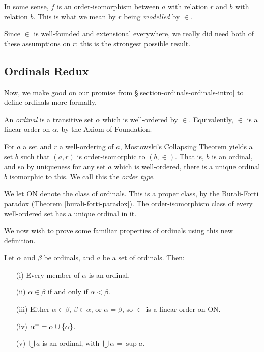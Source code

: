 \documentclass{article}
\begin{document}
\begin{note}
	In some sense, $f$ is an order-isomorphism between $a$ with relation $r$ and $b$ with relation $b$. This is what we mean by $r$ being \textit{modelled} by $\in$.
\end{note}

\begin{corollary}
    Since $\in$ is well-founded and extensional everywhere, we really did need both of these assumptions on $r$: this is the strongest possible result.
\end{corollary}


\subsection{Ordinals Redux}
\label{section-set-theory-ordinals}

Now, we make good on our promise from \S\ref{section-ordinals-ordinals-intro} to define ordinals more formally.

\begin{definition}[Ordinal]
	\label{ch5-formal-ordinal}
    An \textit{ordinal} is a transitive set $\alpha$ which is well-ordered by $\in$. Equivalently, $\in$ is a linear order on $\alpha$, by the Axiom of Foundation.
\end{definition}

\begin{note}
	For $a$ a set and $r$ a well-ordering of $a$, Mostowski's Collapsing Theorem yields a set $b$ such that $(a, r)$ is order-isomorphic to $(b, \in)$. That is, $b$ is an ordinal, and so by uniqueness for any set $a$ which is well-ordered, there is a unique ordinal $b$ isomorphic to this. We call this the \textit{order type}.
\end{note}

\begin{note}
	We let ON denote the class of ordinals. This is a proper class, by the Burali-Forti paradox (Theorem \ref{burali-forti-paradox}). The order-isomorphism class of every well-ordered set has a unique ordinal in it.
\end{note}

We now wish to prove some familiar properties of ordinals using this new definition.

\begin{proposition}
    Let $\alpha$ and $\beta$ be ordinals, and $a$ be a set of ordinals. Then:
    \begin{enumerate}
	    \item[(i)] Every member of $\alpha$ is an ordinal.
	    \item[(ii)] $\alpha \in \beta$ if and only if $\alpha < \beta$.
		\item[(iii)] Either $\alpha \in \beta$, $\beta \in \alpha$, or $\alpha = \beta$, so $\in$ is a linear order on ON.
		\item[(iv)] $\alpha^+ = \alpha \cup \left\lbrace \alpha \right\rbrace$.
		\item[(v)] $\bigcup a$ is an ordinal, with $\bigcup \alpha = \sup a$.
	\end{enumerate}
\end{proposition}
\end{document}
